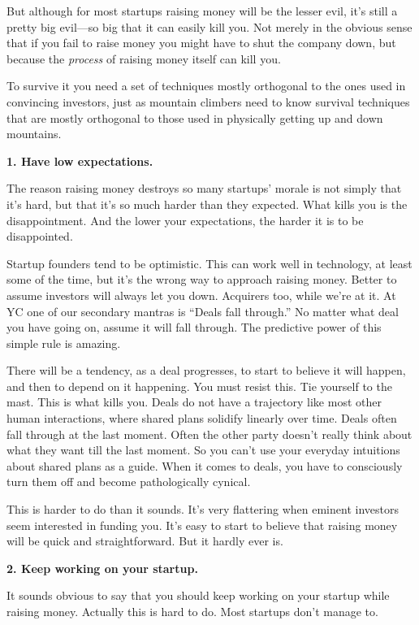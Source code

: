 But although for most startups raising money will be the lesser evil,
it's still a pretty big evil---so big that it can easily kill you. Not
merely in the obvious sense that if you fail to raise money you might
have to shut the company down, but because the \emph{process} of raising
money itself can kill you.

To survive it you need a set of techniques mostly orthogonal to the ones
used in convincing investors, just as mountain climbers need to know
survival techniques that are mostly orthogonal to those used in
physically getting up and down mountains.

\textbf{1. Have low expectations.}

The reason raising money destroys so many startups' morale is not simply
that it's hard, but that it's so much harder than they expected. What
kills you is the disappointment. And the lower your expectations, the
harder it is to be disappointed.

Startup founders tend to be optimistic. This can work well in
technology, at least some of the time, but it's the wrong way to
approach raising money. Better to assume investors will always let you
down. Acquirers too, while we're at it. At YC one of our secondary
mantras is ``Deals fall through.'' No matter what deal you have going
on, assume it will fall through. The predictive power of this simple
rule is amazing.

There will be a tendency, as a deal progresses, to start to believe it
will happen, and then to depend on it happening. You must resist this.
Tie yourself to the mast. This is what kills you. Deals do not have a
trajectory like most other human interactions, where shared plans
solidify linearly over time. Deals often fall through at the last
moment. Often the other party doesn't really think about what they want
till the last moment. So you can't use your everyday intuitions about
shared plans as a guide. When it comes to deals, you have to consciously
turn them off and become pathologically cynical.

This is harder to do than it sounds. It's very flattering when eminent
investors seem interested in funding you. It's easy to start to believe
that raising money will be quick and straightforward. But it hardly ever
is.

\textbf{2. Keep working on your startup.}

It sounds obvious to say that you should keep working on your startup
while raising money. Actually this is hard to do. Most startups don't
manage to.

